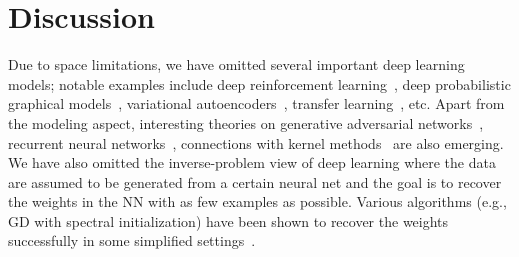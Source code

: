 \section{Discussion}\label{sec:discuss}

Due to space limitations, we have omitted several important deep learning models; notable examples include deep reinforcement learning~\citep{mnih2015human}, deep probabilistic graphical models~\citep{salakhutdinov2009deep}, variational autoencoders~\citep{kingma2013auto}, transfer learning~\citep{yosinski2014transferable}, etc. Apart from the modeling aspect, interesting theories on generative adversarial networks~\citep{arora2017generalization, bai2018approximability}, recurrent neural networks~\citep{AL2018-RNNgen}, connections with kernel methods~\citep{jacot2018neural,arora2019fine} are also emerging. We have also omitted the inverse-problem view of deep learning where the data are assumed to be generated from a certain neural net and the goal is to recover the weights in the NN with as few examples as possible. Various algorithms (e.g., GD with spectral initialization) have been shown to recover the weights successfully in some simplified settings~\citep{zhong2017recovery, soltanolkotabi2017learning, goel2018learning, mondelli2018connection, chen2018gradient,fu2018local}.

